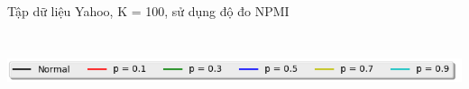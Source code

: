 \documentclass[pdf]{beamer}
\begin{document}
\begin{frame}{Tập dữ liệu Yahoo, K = 100, sử dụng độ đo NPMI }
\begin{columns}[T] %
	\begin{column}{.50\textwidth}
		\begin{figure}
		\end{figure}
	\end{column} %
	\hfill%
	\begin{column}{.50\textwidth}
		\begin{figure}
		\end{figure}				
	\end{column} %
\end{columns}
\begin{center}
	\includegraphics[width=1\textwidth]{menu.png}	
\end{center}
\end{frame}
\end{document}
